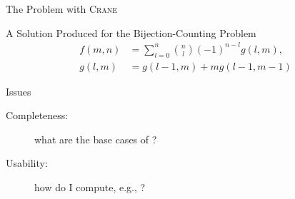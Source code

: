 \documentclass{beamer}
\begin{document}
\begin{frame}{The Problem with \textsc{Crane}}
  \begin{block}{A Solution Produced for the Bijection-Counting Problem}
  \begin{align*}
    f(m, n) &= \sum_{l=0}^{n} \binom{n}{l}{(-1)}^{n-l}g(l, m),\\
    g(l, m) &= g(l-1, m) + mg(l-1, m-1)
  \end{align*}
  \end{block}
  \pause
  \begin{alertblock}{Issues}
    \begin{description}
      \item[Completeness:] what are the base cases of ?
      \item[Usability:] how do I compute, e.g., ?
    \end{description}
  \end{alertblock}
\end{frame}
\end{document}
